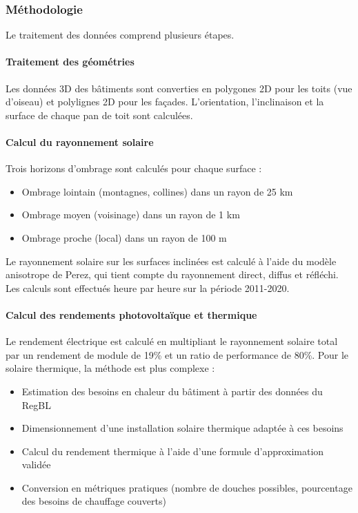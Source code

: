 \subsubsection{Méthodologie}
\par{Le traitement des données comprend plusieurs étapes.}
\paragraph{Traitement des géométries}
\par{Les données 3D des bâtiments sont converties en polygones 2D pour les toits (vue d'oiseau) et polylignes 2D pour les façades. L'orientation, l'inclinaison et la surface de chaque pan de toit sont calculées.}
\paragraph{Calcul du rayonnement solaire}
Trois horizons d'ombrage sont calculés pour chaque surface :
\begin{itemize}
    \item Ombrage lointain (montagnes, collines) dans un rayon de 25 km
    \item Ombrage moyen (voisinage) dans un rayon de 1 km
    \item Ombrage proche (local) dans un rayon de 100 m
\end{itemize}
\par{Le rayonnement solaire sur les surfaces inclinées est calculé à l'aide du modèle anisotrope de Perez, qui tient compte du rayonnement direct, diffus et réfléchi. Les calculs sont effectués heure par heure sur la période 2011-2020.}
\paragraph{Calcul des rendements photovoltaïque et thermique}
\par{Le rendement électrique est calculé en multipliant le rayonnement solaire total par un rendement de module de 19\% et un ratio de performance de 80\%. Pour le solaire thermique, la méthode est plus complexe :}
\begin{itemize}
    \item Estimation des besoins en chaleur du bâtiment à partir des données du RegBL
    \item Dimensionnement d'une installation solaire thermique adaptée à ces besoins
    \item Calcul du rendement thermique à l'aide d'une formule d'approximation validée
    \item Conversion en métriques pratiques (nombre de douches possibles, pourcentage des besoins de chauffage couverts)
\end{itemize}
